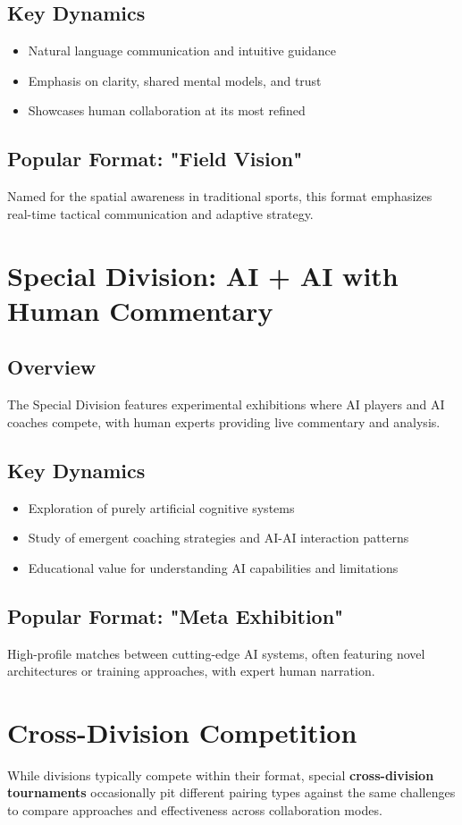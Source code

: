 \subsection{Key Dynamics}
\begin{itemize}[leftmargin=*]
  \item Natural language communication and intuitive guidance
  \item Emphasis on clarity, shared mental models, and trust
  \item Showcases human collaboration at its most refined
\end{itemize}

\subsection{Popular Format: "Field Vision"}
Named for the spatial awareness in traditional sports, this format emphasizes real-time tactical communication and adaptive strategy.

\section{Special Division: AI + AI with Human Commentary}

\subsection{Overview}
The Special Division features experimental exhibitions where AI players and AI coaches compete, with human experts providing live commentary and analysis.

\subsection{Key Dynamics}
\begin{itemize}[leftmargin=*]
  \item Exploration of purely artificial cognitive systems
  \item Study of emergent coaching strategies and AI-AI interaction patterns
  \item Educational value for understanding AI capabilities and limitations
\end{itemize}

\subsection{Popular Format: "Meta Exhibition"}
High-profile matches between cutting-edge AI systems, often featuring novel architectures or training approaches, with expert human narration.

\section{Cross-Division Competition}

While divisions typically compete within their format, special \textbf{cross-division tournaments} occasionally pit different pairing types against the same challenges to compare approaches and effectiveness across collaboration modes.

